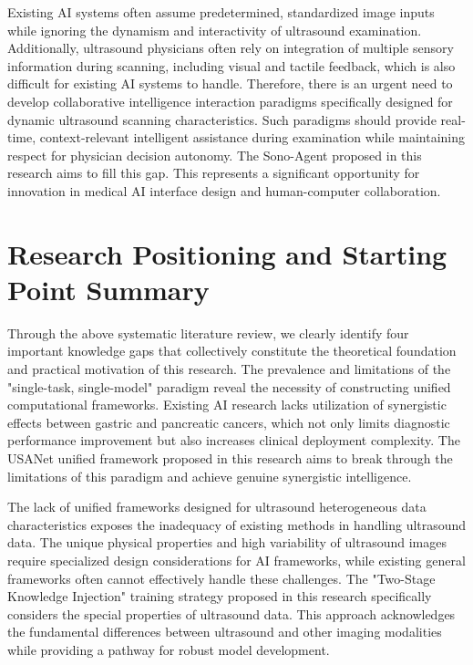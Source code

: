 Existing AI systems often assume predetermined, standardized image inputs while ignoring the dynamism and interactivity of ultrasound examination. Additionally, ultrasound physicians often rely on integration of multiple sensory information during scanning, including visual and tactile feedback, which is also difficult for existing AI systems to handle. Therefore, there is an urgent need to develop collaborative intelligence interaction paradigms specifically designed for dynamic ultrasound scanning characteristics. Such paradigms should provide real-time, context-relevant intelligent assistance during examination while maintaining respect for physician decision autonomy. The Sono-Agent proposed in this research aims to fill this gap. This represents a significant opportunity for innovation in medical AI interface design and human-computer collaboration.

\section{Research Positioning and Starting Point Summary}

Through the above systematic literature review, we clearly identify four important knowledge gaps that collectively constitute the theoretical foundation and practical motivation of this research. The prevalence and limitations of the "single-task, single-model" paradigm reveal the necessity of constructing unified computational frameworks. Existing AI research lacks utilization of synergistic effects between gastric and pancreatic cancers, which not only limits diagnostic performance improvement but also increases clinical deployment complexity. The USANet unified framework proposed in this research aims to break through the limitations of this paradigm and achieve genuine synergistic intelligence.

The lack of unified frameworks designed for ultrasound heterogeneous data characteristics exposes the inadequacy of existing methods in handling ultrasound data. The unique physical properties and high variability of ultrasound images require specialized design considerations for AI frameworks, while existing general frameworks often cannot effectively handle these challenges. The "Two-Stage Knowledge Injection" training strategy proposed in this research specifically considers the special properties of ultrasound data. This approach acknowledges the fundamental differences between ultrasound and other imaging modalities while providing a pathway for robust model development.

